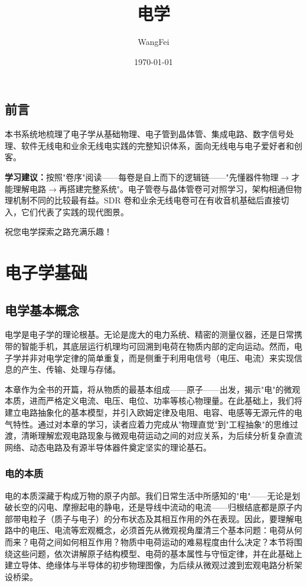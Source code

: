 \documentclass[12pt,UTF8]{ctexbook}
\title{\heiti\zihao{0} 电学}
\author{WangFei}
\date{\today}
\begin{document}
\maketitle
\tableofcontents

\frontmatter
\chapter{前言}

本书系统地梳理了电子学从基础物理、电子管到晶体管、集成电路、数字信号处理、软件无线电和业余无线电实践的完整知识体系，面向无线电与电子爱好者和创客。

\medskip
\noindent\textbf{学习建议：}按照"卷序"阅读——每卷是自上而下的逻辑链——"先懂器件物理$\rightarrow$才能理解电路$\rightarrow$再搭建完整系统"。电子管卷与晶体管卷可对照学习，架构相通但物理机制不同的比较最有益。SDR 卷和业余无线电卷可在有收音机基础后直接切入，它们代表了实践的现代图景。

\medskip
\noindent 祝您电学探索之路充满乐趣！

\mainmatter

\part{电子学基础}

\chapter{电学基本概念}
\label{chap:basic_electricity}

电学是电子学的理论根基。无论是庞大的电力系统、精密的测量仪器，还是日常携带的智能手机，其底层运行机理均可回溯到电荷在物质内部的定向运动。然而，电子学并非对电学定律的简单重复，而是侧重于利用电信号（电压、电流）来实现信息的产生、传输、处理与存储。

本章作为全书的开篇，将从物质的最基本组成——原子——出发，揭示"电"的微观本质，进而严格定义电流、电压、电位、功率等核心物理量。在此基础上，我们将建立电路抽象化的基本模型，并引入欧姆定律及电阻、电容、电感等无源元件的电气特性。通过对本章的学习，读者应着力完成从"物理直觉"到"工程抽象"的思维过渡，清晰理解宏观电路现象与微观电荷运动之间的对应关系，为后续分析复杂直流网络、动态电路及有源半导体器件奠定坚实的理论基石。

\section{电的本质}
\label{sec:electricity_nature}

电的本质深藏于构成万物的原子内部。我们日常生活中所感知的"电"——无论是划破长空的闪电、摩擦起电的静电，还是导线中流动的电流——归根结底都是原子内部带电粒子（质子与电子）的分布状态及其相互作用的外在表现。因此，要理解电路中的电压、电流等宏观概念，必须首先从微观视角厘清三个基本问题：电荷从何而来？电荷之间如何相互作用？物质中电荷运动的难易程度由什么决定？本节将围绕这些问题，依次讲解原子结构模型、电荷的基本属性与守恒定律，并在此基础上建立导体、绝缘体与半导体的初步物理图像，为后续从微观过渡到宏观电路分析架设桥梁。
\end{document}
